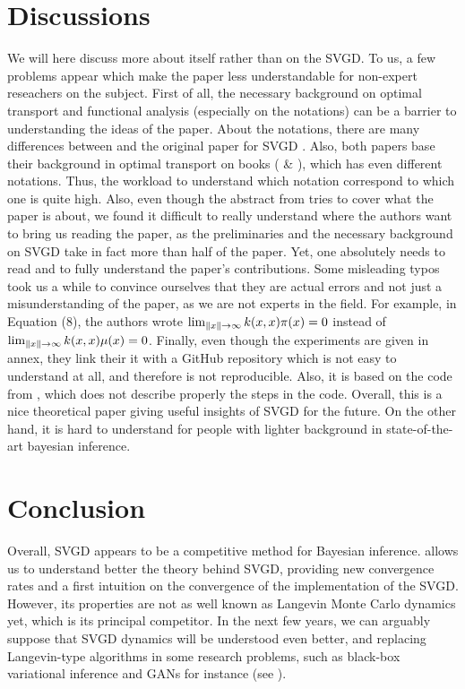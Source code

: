 \documentclass{article}
\DeclarePairedDelimiter{\norm}{\|}{\|}
\begin{document}
\section{Discussions}
We will here discuss more about \cite{main-paper} itself rather than on the SVGD. To us, a few problems appear  which make the paper less understandable for non-expert reseachers on the subject. \newline
First of all, the necessary background on optimal transport and functional analysis (especially on the notations) can be a barrier to understanding the ideas of the paper. About the notations, there are many differences between \cite{main-paper} and the original paper for SVGD \cite{Original-SVGD}. Also, both papers base their background in optimal transport on books (\cite{villani2003} \& \cite{villani2008}), which has even different notations. Thus, the workload to understand which notation correspond to which one is quite high. \newline
Also, even though the abstract from \cite{main-paper} tries to cover what the paper is about, we found it difficult to really understand where the authors want to bring us reading the paper, as the preliminaries and the necessary background on SVGD take in fact more than half of the paper.
Yet, one absolutely needs to read \cite{Original-SVGD} and \cite{SVGD-flow} to fully understand the paper's contributions. \newline
Some misleading typos took us a while to convince ourselves that they are actual errors and not
just a misunderstanding of the paper, as we are not experts in the field. For example,
in Equation (8), the authors wrote $\lim_{\norm{x} \to \infty} k(x, x)\pi(x) = 0$ instead of $\lim_{\norm{x} \to \infty} k(x, x)\mu(x) = 0$. \newline
Finally, even though the experiments are given in annex, they link their it with a GitHub repository which is not easy to understand at all, and therefore is not reproducible. Also, it is based on the code from \cite{Original-SVGD}, which does not describe properly the steps in the code. \newline
Overall, this is a nice theoretical paper giving useful insights of SVGD for the future. On the other hand, it is hard to understand for people with lighter background in state-of-the-art bayesian inference.
 
\section{Conclusion}
Overall, SVGD appears to be a competitive method for Bayesian inference. \cite{main-paper} allows us to understand better the theory behind SVGD,
providing new convergence rates and a first intuition on the convergence of the implementation of the SVGD. However, its properties are not as well known as Langevin Monte Carlo dynamics yet, which is its principal competitor. In the next few years, we can arguably suppose that SVGD dynamics will be understood even better, and replacing Langevin-type algorithms in some research problems, such as black-box variational inference and GANs for instance (see \cite{ccl}).
\end{document}
